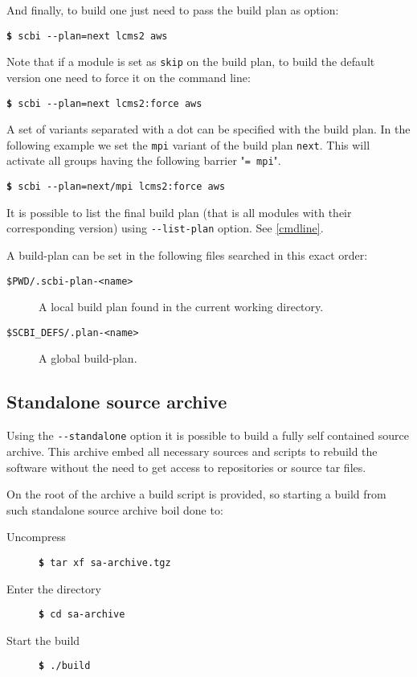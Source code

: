 \documentclass[a4paper,12pt,twoside]{article}
\newcommand{\code}[1]{\texttt{#1}}
\newcommand{\cmd}[1]{\tabto{1cm}\hspace{0.5cm}\texttt{\textbf{\$} #1}}
\newcommand{\ddash}{-{}-}
\begin{document}
And finally, to build one just need to pass the build plan as option:

\cmd{scbi \ddash{}plan=next lcms2 aws}

Note that if a module is set as \code{skip} on the build plan, to build the default version one need to force it on the command line:

\cmd{scbi \ddash{}plan=next lcms2:force aws}

A set of variants separated with a dot can be specified with the build plan. In the following example we set the \code{mpi} variant of the build plan \code{next}. This will activate all groups having the following barrier "\code{= mpi}".

\cmd{scbi \ddash{}plan=next/mpi lcms2:force aws}

It is possible to list the final build plan (that is all modules with their corresponding version) using \code{\ddash{}list-plan} option. See \ref{cmdline}.

A build-plan can be set in the following files searched in this exact order:

\begin{description}
	\item[\code{\$PWD/.scbi-plan-<name>}] A local build plan found in the current working directory.

	\item[\code{\$SCBI\_DEFS/.plan-<name>}] A global build-plan.
\end{description}

\subsection{Standalone source archive}
\label{standalone}

Using the \code{\ddash{}standalone} option it is possible to build a fully self contained source archive. This archive embed all necessary sources and scripts to rebuild the software without the need to get access to repositories or source tar files.

On the root of the archive a build script is provided, so starting a build from such standalone source archive boil done to:

\begin{description}
	\item[Uncompress] \cmd{tar xf sa-archive.tgz}
	\item[Enter the directory] \cmd{cd sa-archive}
	\item[Start the build] \cmd{./build}
\end{description}
\end{document}

